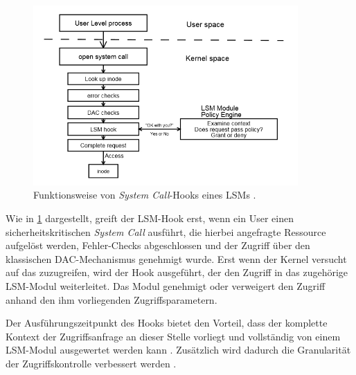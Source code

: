 \documentclass[../main.tex]{subfiles}
\begin{document}
			\begin{figure}[h]
					\centering
					\includegraphics[width=0.9\textwidth]{./images/sec_LSMHook.jpg}
					\caption{Funktionsweise von \emph{System Call}-Hooks eines LSMs \cite[S.3]{LSMFramework}.}
					\label{fig:sec_LSMHook}
			\end{figure}

			Wie in \fig \ref{fig:sec_LSMHook} dargestellt, greift der LSM-Hook erst, wenn ein User einen sicherheitskritischen \emph{System Call} ausführt, die hierbei angefragte Ressource aufgelöst werden, Fehler-Checks abgeschlossen und der Zugriff über den klassischen DAC-Mechanismus genehmigt wurde. Erst wenn der Kernel versucht auf das  zuzugreifen, wird der Hook ausgeführt, der den Zugriff in das zugehörige LSM-Modul weiterleitet. Das Modul genehmigt oder verweigert den Zugriff anhand den ihm vorliegenden Zugriffsparametern.

			Der Ausführungszeitpunkt des Hooks bietet den Vorteil, dass der komplette Kontext der Zugriffsanfrage an dieser Stelle vorliegt und vollständig von einem LSM-Modul ausgewertet werden kann \cite[S.2]{LSMFramework}. Zusätzlich wird dadurch die Granularität der Zugriffskontrolle verbessert werden \cite{LSMDesign}.




\end{document}
